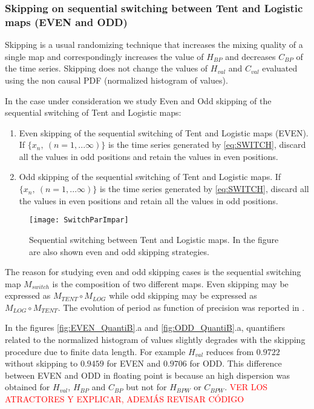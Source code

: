 \subsubsection{Skipping on sequential switching between Tent and Logistic maps (EVEN and ODD)} \label{sssec:skipp}

Skipping is a usual randomizing technique that increases the mixing quality of a single map and correspondingly increases the value of $H_{BP}$ and decreases $C_{BP} $ of the time series.
Skipping does not change the values of $H_{val}$ and $C_{val}$ evaluated using the non causal PDF (normalized histogram of values)\cite{DeMicco2008}.

In the case under consideration we study Even and Odd skipping of the sequential switching of Tent and Logistic maps:
\begin{enumerate}
	\item Even skipping of the sequential switching of Tent and Logistic maps (EVEN).\\
	If $\{x_n,~(n=1,...\infty)\}$ is the time series generated by \ref{eq:SWITCH}, discard all the values in odd positions and retain the values in even positions.
	\item Odd skipping of the sequential switching of Tent and Logistic maps.
	If $\{x_n,~(n=1,...\infty)\}$ is the time series generated by \ref{eq:SWITCH}, discard all the values in even positions and retain all the values in odd positions.
\end{enumerate}

\begin{figure}
	\texttt{[image: SwitchParImpar]}
	\caption{Sequential switching between Tent and Logistic maps. In the figure are also shown even and odd skipping strategies.} \label{fig:seq}
\end{figure}

The reason for studying even and odd skipping cases is the sequential switching map $M_{switch}$ is the composition of two different maps.
Even skipping may be expressed as $M_{TENT}\circ M_{LOG}$ while odd skipping may be expressed as $M_{LOG} \circ M_{TENT}$.
The evolution of period as function of precision was reported in \cite{Nagaraj2008}.

In the figures \ref{fig:EVEN_QuantiB}.a and \ref{fig:ODD_QuantiB}.a, quantifiers related to the normalized histogram of values slightly degrades with the skipping procedure due to finite data length.
For example $H_{val}$ reduces from $0.9722$ without skipping to $0.9459$ for EVEN and $0.9706$ for ODD. 
This difference between EVEN and ODD in floating point is because an high dispersion was obtained for $H_{val}$, $H_{BP}$ and $C_{BP}$ but not for $H_{BPW}$ or $C_{BPW}$.
\textcolor{red}{VER LOS ATRACTORES Y EXPLICAR, ADEMÁS REVISAR CÓDIGO}


